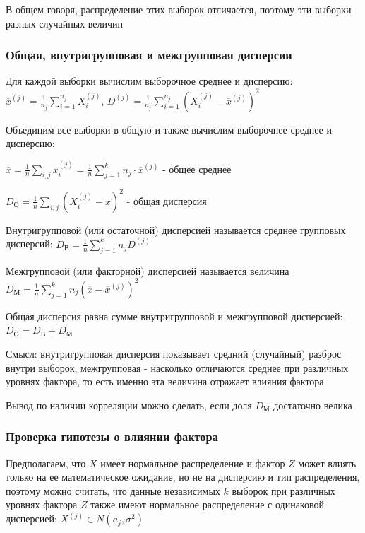 \documentclass[12pt]{article}
\begin{document}
\Nota В общем говоря, распределение этих выборок отличается, поэтому эти выборки разных случайных величин

\subsubsection{Общая, внутригрупповая и межгрупповая дисперсии}

Для каждой выборки вычислим выборочное среднее и дисперсию: $\overline{x}^{(j)} = \frac{1}{n_j} \sum_{i = 1}^{n_j} X_i^{(j)}$, 
$D^{(j)} = \frac{1}{n_j} \sum_{i = 1}^{n_j} (X_i^{(j)} - \overline{x}^{(j)})^2$

Объединим все выборки в общую и также вычислим выборочнее среднее и дисперсию: 

$\overline{x} = \frac{1}{n} \sum_{i, j} x^{(j)}_i = \frac{1}{n} \sum_{j = 1}^k n_j \cdot \overline{x}^{(j)}$ - общее среднее

$D_\text{О} = \frac{1}{n} \sum_{i, j} (X^{(j)}_i - \overline{x})^2$ - общая дисперсия

\Def Внутригрупповой (или остаточной) дисперсией называется среднее групповых дисперсий: $D_{\text{В}} = \frac{1}{n} \sum_{j = 1}^k n_j D^{(j)}$

\Def Межгрупповой (или факторной) дисперсией называется величина $D_{\text{М}} = \frac{1}{n} \sum_{j = 1}^k n_j (\overline{x} - \overline{x}^{(j)})^2$

\begin{MyTheorem}
     Общая дисперсия равна сумме внутригрупповой и межгрупповой дисперсией: $D_\text{О} = D_\text{В} + D_\text{М}$
\end{MyTheorem}

Смысл: внутригрупповая дисперсия показывает средний (случайный) разброс внутри выборок, межгрупповая - насколько отличаются среднее при различных 
уровнях фактора, то есть именно эта величина отражает влияния фактора

Вывод по наличии корреляции можно сделать, если доля $D_\text{М}$ достаточно велика

\hypertarget{factor_influence_hypothesis}{}

\subsubsection{Проверка гипотезы о влиянии фактора}

Предполагаем, что $X$ имеет нормальное распределение и фактор $Z$ может влиять только на ее математическое ожидание, 
но не на дисперсию и тип распределения, поэтому можно считать, что данные независимых $k$ выборок при различных уровнях фактора $Z$
также имеют нормальное распределение с одинаковой дисперсией: $X^{(j)} \in N(a_j, \sigma^2)$
\end{document}

